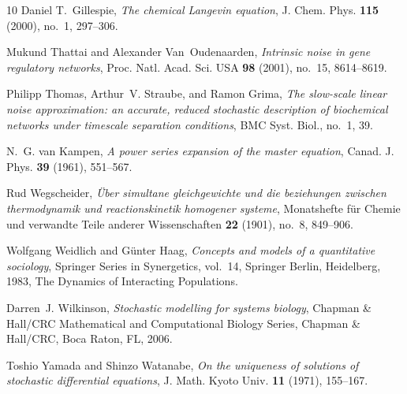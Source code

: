 \documentclass[10pt,a4paper]{amsart}
\theoremstyle{definition}
\theoremstyle{remark}
\theoremstyle{consequence}
\numberwithin{equation}{section}
\begin{document}
\begin{thebibliography}{10}
Daniel T.~Gillespie, \emph{The chemical {L}angevin equation}, J. Chem. Phys.
  \textbf{115} (2000), no.~1, 297--306.

Mukund Thattai and Alexander Van~Oudenaarden, \emph{Intrinsic noise in gene
  regulatory networks}, Proc. Natl. Acad. Sci. USA \textbf{98} (2001), no.~15,
  8614--8619.

Philipp Thomas, Arthur~V. Straube, and Ramon Grima, \emph{The slow-scale linear
  noise approximation: an accurate, reduced stochastic description of
  biochemical networks under timescale separation conditions}, BMC Syst. Biol.,
  no.~1, 39.

N.~G. van Kampen, \emph{A power series expansion of the master equation},
  Canad. J. Phys. \textbf{39} (1961), 551--567. 

Rud Wegscheider, \emph{{\"U}ber simultane gleichgewichte und die beziehungen
  zwischen thermodynamik und reactionskinetik homogener systeme}, Monatshefte
  f{\"u}r Chemie und verwandte Teile anderer Wissenschaften \textbf{22} (1901),
  no.~8, 849--906.

Wolfgang Weidlich and G{\"u}nter Haag, \emph{Concepts and models of a
  quantitative sociology}, Springer Series in Synergetics, vol.~14, Springer
  Berlin, Heidelberg, 1983, The Dynamics of Interacting Populations.

Darren~J. Wilkinson, \emph{Stochastic modelling for systems biology}, Chapman
  \& Hall/CRC Mathematical and Computational Biology Series, Chapman \&
  Hall/CRC, Boca Raton, FL, 2006.

Toshio Yamada and Shinzo Watanabe, \emph{On the uniqueness of solutions of
  stochastic differential equations}, J. Math. Kyoto Univ. \textbf{11} (1971),
  155--167.

\end{thebibliography}


\end{document}
